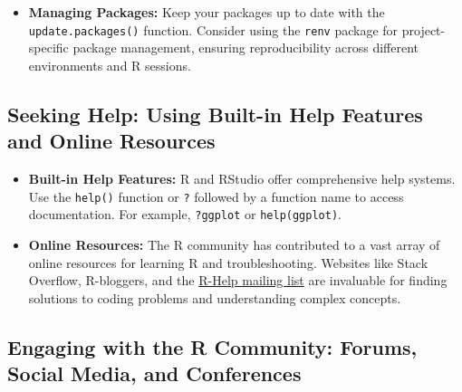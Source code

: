 \documentclass[
]{book}
\providecommand{\tightlist}{%
  \setlength{\itemsep}{0pt}\setlength{\parskip}{0pt}}
\begin{document}
\begin{itemize}
\tightlist
\item
  \textbf{Managing Packages:} Keep your packages up to date with the \texttt{update.packages()} function. Consider using the \texttt{renv} package for project-specific package management, ensuring reproducibility across different environments and R sessions.
\end{itemize}

\hypertarget{seeking-help-using-built-in-help-features-and-online-resources}{%
\subsection*{Seeking Help: Using Built-in Help Features and Online Resources}\label{seeking-help-using-built-in-help-features-and-online-resources}}

\begin{itemize}
\item
  \textbf{Built-in Help Features:} R and RStudio offer comprehensive help systems. Use the \texttt{help()} function or \texttt{?} followed by a function name to access documentation. For example, \texttt{?ggplot} or \texttt{help(ggplot)}.
\item
  \textbf{Online Resources:} The R community has contributed to a vast array of online resources for learning R and troubleshooting. Websites like Stack Overflow, R-bloggers, and the \href{https://stat.ethz.ch/mailman/listinfo/r-help}{R-Help mailing list} are invaluable for finding solutions to coding problems and understanding complex concepts.
\end{itemize}

\hypertarget{engaging-with-the-r-community-forums-social-media-and-conferences}{%
\subsection*{Engaging with the R Community: Forums, Social Media, and Conferences}\label{engaging-with-the-r-community-forums-social-media-and-conferences}}
\end{document}
